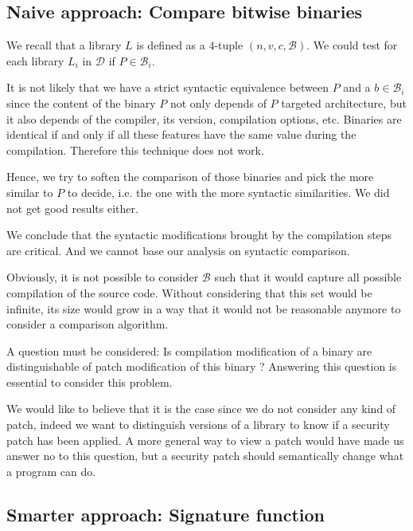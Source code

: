 \documentclass{article}
\begin{document}
    \subsection{Naive approach: Compare bitwise binaries }
    \label{naive-notations}

   We recall that a library $L$ is defined as a $4$-tuple $(n, v, c, \mathcal{B})$. We could test for each library $L_i$ in $\mathcal{D}$ if $P \in
    \mathcal{B}_i$.

    It is not likely that we have a strict syntactic equivalence between
    $P$ and a $b \in \mathcal{B}_i$ since the content of the binary $P$ not only depends of $P$ targeted architecture, but it also depends of the compiler,
    its version, compilation options, etc. Binaries are identical if and only if all these features have the same value during the compilation. Therefore this technique does not work.


Hence, we try to soften the comparison of those binaries and pick the more similar to $P$ to decide, i.e. the one with the more syntactic similarities. We did not get good results either.

   We conclude that the syntactic modifications brought by the compilation steps are critical. And we cannot base our analysis on syntactic comparison.

    
 Obviously, it is not possible to consider $\mathcal{B}$ such that it
    would capture all possible compilation of the source code. Without
    considering that this set would be infinite, its size would grow in a way
    that it would not be reasonable anymore to consider a comparison algorithm.

A question must be considered: Is compilation modification of a
    binary are distinguishable of patch modification of this binary ?
    Answering this question is essential to consider this problem.

We would like to believe that it is the case since we do not
    consider any kind of patch, indeed we want to distinguish versions of a
    library to know if a security patch has been applied. A more general way
    to view a patch would have made us answer no to this question, but a
    security patch should semantically change what a program can do.

    \subsection{Smarter approach: Signature function}\label{approach-sign}
\end{document}
